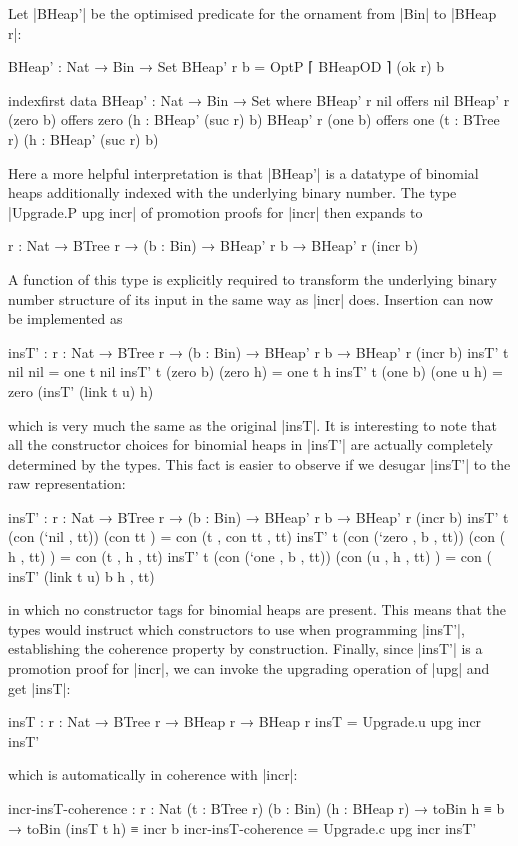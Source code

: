 Let |BHeap'| be the optimised predicate for the ornament from |Bin| to |BHeap r|:
\begin{code}
BHeap' : Nat → Bin → Set
BHeap' r b = OptP ⌈ BHeapOD ⌉ (ok r) b

indexfirst data BHeap' : Nat → Bin → Set where
  BHeap' r nil        offers  nil
  BHeap' r (zero  b)  offers  zero  (h : BHeap' (suc r) b)
  BHeap' r (one   b)  offers  one   (t : BTree r) (h : BHeap' (suc r) b)
\end{code}
Here a more helpful interpretation is that |BHeap'| is a datatype of binomial heaps additionally indexed with the underlying binary number.
The type |Upgrade.P upg incr| of promotion proofs for |incr| then expands to
\begin{code}
{r : Nat} → BTree r → (b : Bin) → BHeap' r b → BHeap' r (incr b)
\end{code}
A function of this type is explicitly required to transform the underlying binary number structure of its input in the same way as |incr| does.
Insertion can now be implemented as
\begin{code}
insT' : {r : Nat} → BTree r → (b : Bin) → BHeap' r b → BHeap' r (incr b)
insT' t nil        nil         = one t nil
insT' t (zero  b)  (zero   h)  = one t h
insT' t (one   b)  (one u  h)  = zero (insT' (link t u) h)
\end{code}
which is very much the same as the original |insT|.
It is interesting to note that all the constructor choices for binomial heaps in |insT'| are actually completely determined by the types.
This fact is easier to observe if we desugar |insT'| to the raw representation:
\begin{code}
insT' : {r : Nat} → BTree r → (b : Bin) → BHeap' r b → BHeap' r (incr b)
insT' t (con (`nil   ,      tt))  (con            tt   ) = con (t ,  con tt                , tt)
insT' t (con (`zero  , b ,  tt))  (con (     h ,  tt)  ) = con (t ,  h                     , tt)
insT' t (con (`one   , b ,  tt))  (con (u ,  h ,  tt)  ) = con (     insT' (link t u) b h  , tt)
\end{code}
in which no constructor tags for binomial heaps are present.
This means that the types would instruct which constructors to use when programming |insT'|, establishing the coherence property by construction.
Finally, since |insT'| is a promotion proof for |incr|, we can invoke the upgrading operation of |upg| and get |insT|:
\begin{code}
insT : {r : Nat} → BTree r → BHeap r → BHeap r
insT = Upgrade.u upg incr insT'
\end{code}
which is automatically in coherence with |incr|:
\begin{code}
incr-insT-coherence :  {r : Nat} (t : BTree r) (b : Bin) (h : BHeap r) →
                       toBin h ≡ b → toBin (insT t h) ≡ incr b
incr-insT-coherence = Upgrade.c upg incr insT'
\end{code}

